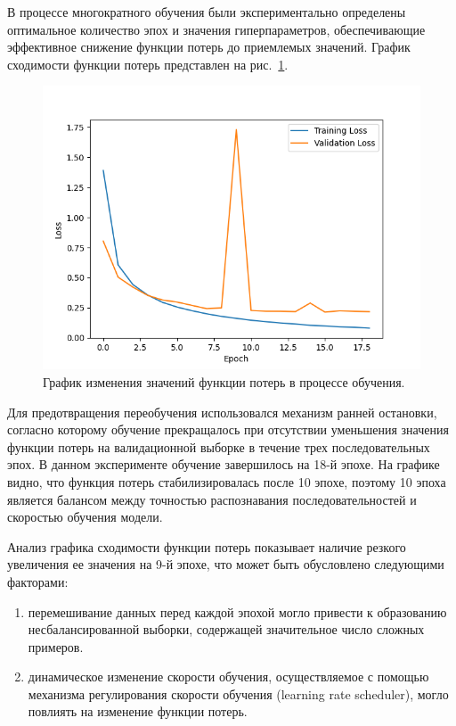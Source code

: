 В процессе многократного обучения были экспериментально определены оптимальное 
количество эпох и значения гиперпараметров, обеспечивающие эффективное снижение 
функции потерь до приемлемых значений. График сходимости функции потерь 
представлен на рис.~\ref{fig:loss}.

\begin{figure}[H]
    \centering
    \includegraphics[width=0.8\linewidth]{imgs/textcaptcha/Model_loss.png}
    \caption{График изменения значений функции потерь в процессе обучения.}
    \label{fig:loss}
\end{figure}

Для предотвращения переобучения использовался механизм ранней остановки, согласно 
которому обучение прекращалось при отсутствии уменьшения значения функции потерь 
на валидационной выборке в течение трех последовательных эпох. В данном 
эксперименте обучение завершилось на 18-й эпохе. На графике видно, что функция 
потерь стабилизировалась после 10 эпохе, поэтому 10 эпоха является балансом между 
точностью распознавания последовательностей и скоростью обучения модели.

Анализ графика сходимости функции потерь показывает наличие резкого увеличения ее 
значения на 9-й эпохе, что может быть обусловлено следующими факторами:
\begin{enumerate}
    \item перемешивание данных перед каждой эпохой могло привести к образованию 
    несбалансированной выборки, содержащей значительное число сложных примеров.
    \item динамическое изменение скорости обучения, осуществляемое с помощью 
    механизма регулирования скорости обучения (learning rate scheduler), могло 
    повлиять на изменение функции потерь.
\end{enumerate}

